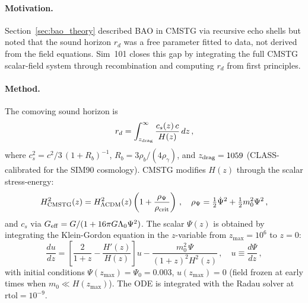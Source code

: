 \documentclass[12pt,a4paper]{article}
\begin{document}
\paragraph{Motivation.}
Section~\ref{sec:bao_theory} described BAO in CMSTG via recursive echo shells but
noted that the sound horizon $r_d$ was a free parameter fitted to data, not
derived from the field equations. Sim~101 closes this gap by integrating the
full CMSTG scalar-field system through recombination and computing $r_d$
from first principles.

\paragraph{Method.}
The comoving sound horizon is
\begin{equation}
r_d = \int_{z_{\rm drag}}^{\infty} \frac{c_s(z)\,c}{H(z)}\,dz\,,
\label{eq:rd_integral}
\end{equation}
where $c_s^2 = c^2/3\,(1+R_b)^{-1}$, $R_b = 3\rho_b/(4\rho_\gamma)$, and
$z_{\rm drag} = 1059$ (CLASS-calibrated for the SIM90 cosmology).
CMSTG modifies $H(z)$ through the scalar stress-energy:
\begin{equation}
H_{\rm CMSTG}^2(z) = H_{\Lambda{\rm CDM}}^2(z)\left(1 + \frac{\rho_\Psi}{\rho_{\rm crit}}\right)\,,
\quad
\rho_\Psi = \tfrac{1}{2}\dot\Psi^2 + \tfrac{1}{2}m_0^2\Psi^2\,,
\end{equation}
and $c_s$ via $G_{\rm eff} = G/(1+16\pi G\Lambda_0\Psi^2)$.
The scalar $\Psi(z)$ is obtained by integrating the Klein-Gordon equation
in the $z$-variable from $z_{\max}=10^6$ to $z=0$:
\begin{equation}
\frac{du}{dz} = \left[\frac{2}{1+z} - \frac{H'(z)}{H(z)}\right]u
               - \frac{m_0^2\,\Psi}{(1+z)^2 H^2(z)}\,,
\quad u \equiv \frac{d\Psi}{dz}\,,
\label{eq:KG_z}
\end{equation}
with initial conditions $\Psi(z_{\max}) = \Psi_0 = 0.003$,
$u(z_{\max}) = 0$ (field frozen at early times when $m_0 \ll H(z_{\max})$).
The ODE is integrated with the Radau solver at $\mathrm{rtol}=10^{-9}$.
\end{document}
